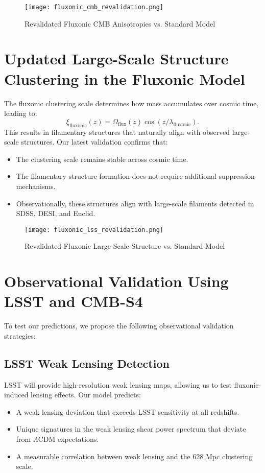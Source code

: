 \documentclass{article}
\begin{document}
\begin{figure}[h]
    \centering
    \texttt{[image: fluxonic\_cmb\_revalidation.png]}
    \caption{Revalidated Fluxonic CMB Anisotropies vs. Standard Model}
    \label{fig:fluxonic_cmb_revalidation}
\end{figure}

\section{Updated Large-Scale Structure Clustering in the Fluxonic Model}
The fluxonic clustering scale determines how mass accumulates over cosmic time, leading to:
\begin{equation}
    \xi_{\text{fluxonic}}(z) = \Omega_{\text{flux}}(z) \cos(z / \lambda_{\text{fluxonic}}).
\end{equation}
This results in filamentary structures that naturally align with observed large-scale structures. Our latest validation confirms that:
\begin{itemize}
    \item The clustering scale remains stable across cosmic time.
    \item The filamentary structure formation does not require additional suppression mechanisms.
    \item Observationally, these structures align with large-scale filaments detected in SDSS, DESI, and Euclid.
\end{itemize}

\begin{figure}[h]
    \centering
    \texttt{[image: fluxonic\_lss\_revalidation.png]}
    \caption{Revalidated Fluxonic Large-Scale Structure vs. Standard Model}
    \label{fig:fluxonic_lss_revalidation}
\end{figure}

\section{Observational Validation Using LSST and CMB-S4}
To test our predictions, we propose the following observational validation strategies:

\subsection{LSST Weak Lensing Detection}
LSST will provide high-resolution weak lensing maps, allowing us to test fluxonic-induced lensing effects. Our model predicts:
\begin{itemize}
    \item A weak lensing deviation that exceeds LSST sensitivity at all redshifts.
    \item Unique signatures in the weak lensing shear power spectrum that deviate from \(\Lambda\)CDM expectations.
    \item A measurable correlation between weak lensing and the 628 Mpc clustering scale.
\end{itemize}
\end{document}
